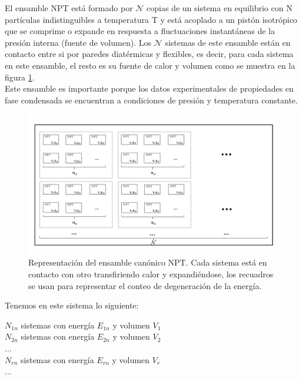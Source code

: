 El ensamble NPT está formado por $\mathcal{N}$ copias de un sistema en equilibrio con N partículas indistinguibles  a temperatura T y está acoplado a un pistón isotrópico que se comprime o expande en respuesta a fluctuaciones instantáneas de la presión interna (fuente de volumen). Los $\mathcal{N}$ sistemas de este ensamble están en contacto entre si por paredes diatérmicas y flexibles, es decir, para cada sistema en este ensamble, el resto es su fuente de calor y volumen como se muestra en la figura \ref{fig:NPTEns}.\\

Este ensamble es importante porque los datos experimentales de propiedades en fase condensada se encuentran a condiciones de presión y temperatura constante.\\

\begin{figure}[!h]
    \centering
    \includegraphics[width=1\textwidth,keepaspectratio=true]{StatMech/nptensemblefig.png}
    \caption{Representación del ensamble canónico NPT. Cada sistema está en contacto con otro transfiriendo calor y expandiéndose, los recuadros se usan para representar el conteo de degeneración de la energía.}
    \label{fig:NPTEns}
\end{figure}

Tenemos en este sistema lo siguiente:\\

\begin{center}
    $N_{1n}$ sistemas con energía $E_{1n}$ y volumen $V_1$\\
    $N_{2n}$ sistemas con energía $E_{2n}$ y volumen $V_2$\\
    ...\\
    $N_{rn}$ sistemas con energía $E_{rn}$ y volumen $V_r$\\
    ...\\
\end{center}

